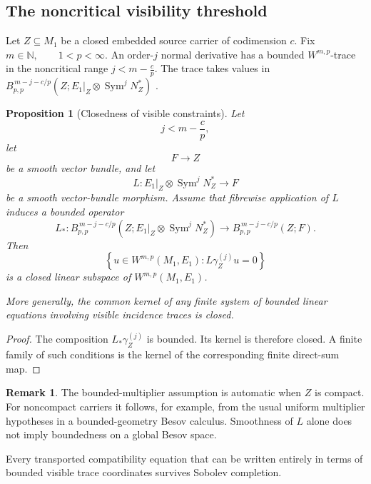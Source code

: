 \documentclass[11pt]{article}
\theoremstyle{plain}
\newtheorem{proposition}[theorem]{Proposition}
\theoremstyle{definition}
\newtheorem{remark}[theorem]{Remark}
\begin{document}
\subsection{The noncritical visibility threshold}
\label{subsec:visibility-threshold}

Let \(Z\subseteq M_1\) be a closed embedded source carrier of codimension \(c\). Fix
\(m\in\mathbb N, \qquad 1<p<\infty\).
An order-\(j\) normal derivative has a bounded \(W^{m,p}\)-trace in
the noncritical range
\(j<m-\frac{c}{p}\).
The trace takes values in
\(B_{p,p}^{\,m-j-c/p} \left( Z; E_1|_Z\otimes\operatorname{Sym}^jN_Z^* \right)\)
\citep{Triebel1992,JonssonWallin1984,GrosseSchneider2013}.

\begin{proposition}[Closedness of visible constraints]
\label{prop:visibility-closed}
Let
\[
  j<m-\frac{c}{p},
\]
let
\[
  F\longrightarrow Z
\]
be a smooth vector bundle, and let
\[
  L:
  E_1|_Z\otimes\operatorname{Sym}^jN_Z^*
  \longrightarrow
  F
\]
be a smooth vector-bundle morphism. Assume that fibrewise application
of \(L\) induces a bounded operator
\[
  L_*:
  B_{p,p}^{\,m-j-c/p}
  \left(
    Z;
    E_1|_Z\otimes\operatorname{Sym}^jN_Z^*
  \right)
  \longrightarrow
  B_{p,p}^{\,m-j-c/p}(Z;F).
\]
Then
\[
  \left\{
    u\in W^{m,p}(M_1,E_1):
    L\gamma_Z^{(j)}u=0
  \right\}
\]
is a closed linear subspace of \(W^{m,p}(M_1,E_1)\).

More generally, the common kernel of any finite system of bounded
linear equations involving visible incidence traces is closed.
\end{proposition}

\begin{proof}
The composition \(L_*\gamma_Z^{(j)}\) is bounded. Its kernel is therefore closed. A finite family of such
conditions is the kernel of the corresponding finite direct-sum map.
\end{proof}

\begin{remark}
The bounded-multiplier assumption is automatic when \(Z\) is compact.
For noncompact carriers it follows, for example, from the usual
uniform multiplier hypotheses in a bounded-geometry Besov calculus.
Smoothness of \(L\) alone does not imply boundedness on a global Besov
space.
\end{remark}

Every transported compatibility equation that can be written
entirely in terms of bounded visible trace coordinates survives
Sobolev completion.
\end{document}
